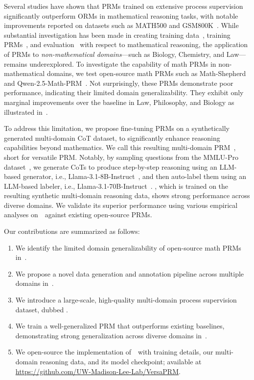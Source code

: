 Several studies have shown that PRMs trained on extensive process supervision significantly outperform ORMs in mathematical reasoning tasks,
with notable improvements reported on datasets such as MATH500 and GSM800K~\citep{luo2024improve,lightman2023let,uesato2022solving}.
While substantial investigation has been made in creating training data~\citep{lightman2023let,wang2024math},
training PRMs~\citep{xiong2024rlhflowmath},
and evaluation~\citep{zheng2024processbench} with respect to mathematical reasoning,
the application of PRMs to \emph{non-mathematical domains}---such as Biology,
Chemistry, and Law---remains underexplored.
To investigate the capability of math PRMs in non-mathematical domains,
we test open-source math PRMs such as 
Math-Shepherd~\citep{wang2024math} and Qwen-2.5-Math-PRM~\citep{zheng2024processbench}.
Not surprisingly,
these PRMs demonstrate poor performance,
indicating their limited domain generalizability.
They exhibit only marginal improvements over the baseline in Law, Philosophy, and Biology
as illustrated in~.


To address this limitation,
we propose fine-tuning PRMs on a synthetically generated multi-domain CoT dataset,
to significantly enhance reasoning capabilities beyond mathematics.
We call this resulting multi-domain PRM~\emph{\ourprm}, short for versatile PRM.
Notably,
by sampling questions from the MMLU-Pro dataset~\citep{wang2024mmlupro},
we generate CoTs to produce step-by-step reasoning
using an LLM-based generator,
i.e., Llama-3.1-8B-Instruct~\citep{dubey2024llama},
and then auto-label them using an LLM-based labeler,
i.e., Llama-3.1-70B-Instruct~\citep{dubey2024llama}.
\ourprm, which is trained on the resulting synthetic multi-domain reasoning data,
shows strong performance across diverse domains.
We validate its superior performance using various empirical analyses on~\ourprm~against existing open-source PRMs.


Our contributions are summarized as follows:
\begin{enumerate}[leftmargin=10px]

    \item We identify the limited domain generalizability of open-source math PRMs in~.

    \item We propose a novel data generation and annotation pipeline across multiple domains in~.

    \item We introduce a large-scale, high-quality multi-domain process supervision dataset, dubbed \emph{\ourdatatrain}.

    \item We train a well-generalized PRM that outperforms existing baselines, demonstrating strong generalization across diverse domains in~.

    \item We open-source the implementation of~\ourprm~with training details, our multi-domain reasoning data, and its model checkpoint; available at \url{https://github.com/UW-Madison-Lee-Lab/VersaPRM}.
\end{enumerate}